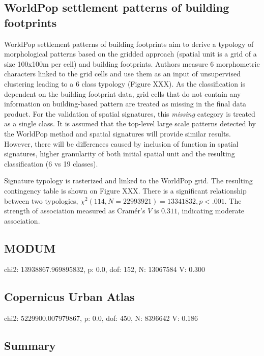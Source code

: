 \subsection*{WorldPop settlement patterns of building footprints}
WorldPop settlement patterns of building footprints aim to derive a typology of
morphological patterns based on the gridded approach (spatial unit is a grid of a size
100x100m per cell) and building footprints. Authors measure 6 morphometric characters
linked to the grid cells and use them as an input of unsupervised clustering leading to
a 6 class typology (Figure XXX).
As the classification is dependent on the building footprint data, grid cells that do
not contain any information on building-based pattern are treated as missing in the final data
product. For the validation of spatial signatures, this \textit{missing} category is
treated as a single class. It is assumed that the top-level large scale patterns
detected by the WorldPop method and spatial signatures will provide similar results.
However, there will be differences caused by inclusion of function in spatial
signatures, higher granularity of both initial spatial unit and the resulting
classification (6 vs 19 classes).

Signature typology is rasterized and linked to the WorldPop grid. The resulting
contingency table is shown on Figure XXX. There is a significant relationship between
two typologies, $\chi^{2} (114, N = 22993921) = 13341832, p < .001$. The strength of
association measured as Cramér's $V$ is $0.311$, indicating moderate association.

\subsection*{MODUM}
    chi2: 13938867.969895832, p: 0.0, dof: 152, N: 13067584
    V: 0.300


\subsection*{Copernicus Urban Atlas}
    chi2: 5229900.007979867, p: 0.0, dof: 450, N: 8396642
    V: 0.186

\subsection*{Summary}
